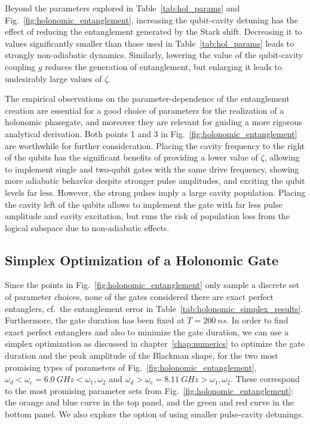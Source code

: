 Beyond the parameters explored in Table~\ref{tab:hol_params} and
Fig.~\ref{fig:holonomic_entanglement}, increasing the qubit-cavity
detuning has the effect of reducing the entanglement generated by the Stark
shift. Decreasing it to values significantly smaller than those used in
Table~\ref{tab:hol_params} leads to strongly non-adiabatic dynamics.
Similarly, lowering the value of the qubit-cavity coupling $g$ reduces the
generation of entanglement, but enlarging it leads to undesirably large values
of $\zeta$.

The empirical observations on the parameter-dependence of the entanglement
creation are essential for a good choice of parameters for the realization of
a holonomic phasegate, and moreover they are relevant for guiding a more
rigorous analytical derivation. Both points 1 and 3 in
Fig.~\ref{fig:holonomic_entanglement} are worthwhile for further consideration.
Placing the cavity frequency to the right of the qubits has the significant
benefits of providing a lower value of $\zeta$, allowing to implement single and
two-qubit gates with the same drive frequency, showing more adiabatic behavior
despite stronger pulse amplitudes, and exciting the qubit levels far less.
However, the strong pulses imply a large cavity population. Placing the cavity
left of the qubits allows to implement the gate with far less pulse amplitude
and cavity excitation, but runs the risk of population loss from the logical
subspace due to non-adiabatic effects.


\subsection{Simplex Optimization of a Holonomic Gate}
\label{subsec:hol_simplex}

Since the points in Fig.~\ref{fig:holonomic_entanglement} only sample
a discrete set of parameter choices, none of the gates considered there are
exact perfect entanglers, cf.\ the entanglement error in
Table~\ref{tab:holonomic_simplex_results}.
Furthermore, the gate duration has been fixed at $T=\SI{200}{ns}$. In order to
find exact perfect entanglers and also to minimize the gate duration, we can use
a simplex optimization as discussed in chapter~\ref{chap:numerics} to optimize
the gate duration and the peak amplitude of the Blackman shape, for the two most
promising types of parameters of Fig.~\ref{fig:holonomic_entanglement},
$\omega_d < \omega_c=\SI{6.0}{GHz} < \omega_1, \omega_2$ and
$\omega_d > \omega_c=\SI{8.11}{GHz} > \omega_1, \omega_2$.
These correspond to the most promising parameter sets from
Fig.~\ref{fig:holonomic_entanglement}: the orange and blue curve in the top
panel, and the green and red curve in the bottom panel.
We also explore the option of using smaller pulse-cavity detunings.

